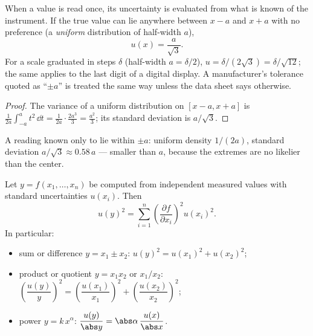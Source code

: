\begin{proposition}\label{prop:b1:units-dimensions:typeB}
When a value is read once, its uncertainty is evaluated from what is
known of the instrument. If the true value can lie anywhere between
$x - a$ and $x + a$ with no preference (a \emph{uniform} distribution of
half-width $a$),
\[
u(x) = \frac{a}{\sqrt 3} .
\]
For a scale graduated in steps $\delta$ (half-width $a = \delta/2$),
$u = \delta/(2\sqrt3) = \delta/\sqrt{12}$; the same applies to the last
digit of a digital display. A manufacturer's tolerance quoted as
``$\pm a$'' is treated the same way unless the data sheet says
otherwise.
\end{proposition}

\begin{proof}
The variance of a uniform distribution on $[x - a, x + a]$ is
$\frac{1}{2a}\int_{-a}^{a} t^2\,\dd t = \frac{1}{2a}\cdot\frac{2a^3}{3}
= \frac{a^2}{3}$; its standard deviation is $a/\sqrt3$.
\end{proof}

\begin{omfigure}

{\small A reading known only to lie within $\pm a$: uniform density
$1/(2a)$, standard deviation $a/\sqrt3 \approx 0.58\,a$ --- smaller than
$a$, because the extremes are no likelier than the center.}
\end{omfigure}

\begin{theorem}\label{thm:b1:units-dimensions:propagation}
Let $y = f(x_1, \dots, x_n)$ be computed from independent measured
values with standard uncertainties $u(x_i)$. Then
\[
u(y)^2 = \sum_{i=1}^n \left(\frac{\partial f}{\partial x_i}\right)^2 u(x_i)^2 .
\]
In particular:
\begin{itemize}
  \item sum or difference $y = x_1 \pm x_2$:
        $u(y)^2 = u(x_1)^2 + u(x_2)^2$;
  \item product or quotient $y = x_1 x_2$ or $x_1/x_2$:
        $\left(\dfrac{u(y)}{y}\right)^2 = \left(\dfrac{u(x_1)}{x_1}\right)^2
        + \left(\dfrac{u(x_2)}{x_2}\right)^2$;
  \item power $y = k\,x^\alpha$: $\dfrac{u(y)}{\abs y} = \abs\alpha\,\dfrac{u(x)}{\abs x}$.
\end{itemize}
\end{theorem}

